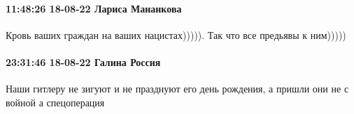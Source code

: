 \paragraph{11:48:26 18-08-22 Лариса Мананкова}

Кровь ваших граждан на ваших нацистах))))). Так что все предьявы к ним)))))

\paragraph{23:31:46 18-08-22 Галина Россия}

Наши гитлеру не зигуют и не празднуют его день рождения, а пришли они не с
войной а спецоперация
